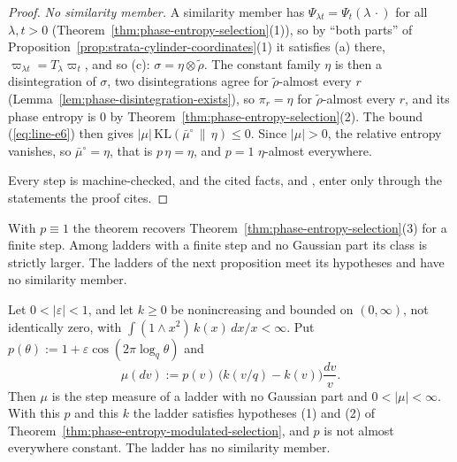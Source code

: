 \begin{proof}
\emph{No similarity member.} A similarity member has $\Psi_{\lambda t} = \Psi_t(\lambda\,\cdot)$
for all $\lambda, t > 0$ (Theorem~\ref{thm:phase-entropy-selection}(1)), so by ``both parts'' of
Proposition~\ref{prop:strata-cylinder-coordinates}(1) it satisfies (a) there,
$\varpi_{\lambda t} = T_\lambda\varpi_t$, and so (c): $\sigma = \eta \otimes \tilde\rho$. The
constant family $\eta$ is then a disintegration of $\sigma$, two disintegrations agree for
$\tilde\rho$-almost every $r$ (Lemma~\ref{lem:phase-disintegration-exists}), so $\pi_r = \eta$ for
$\tilde\rho$-almost every $r$, and its phase entropy is $0$ by
Theorem~\ref{thm:phase-entropy-selection}(2). The bound (\ref{eq:line-e6}) then gives
$|\mu|\,\mathrm{KL}(\bar\mu^\circ \,\|\, \eta) \le 0$. Since $|\mu| > 0$, the relative entropy
vanishes, so $\bar\mu^\circ = \eta$, that is $p\,\eta = \eta$, and $p = 1$ $\eta$-almost
everywhere.

Every step is machine-checked, and the cited facts,  and , enter only
through the statements the proof cites.
\end{proof}

With $p \equiv 1$ the theorem recovers Theorem~\ref{thm:phase-entropy-selection}(3) for a finite
step. Among ladders with a finite step and no Gaussian part its class is strictly larger. The
ladders of the next proposition meet its hypotheses and have no similarity member.

\begin{proposition}
\label{prop:modulated-selection-strict}

Let $0 < |\varepsilon| < 1$, and let $k \ge 0$ be nonincreasing and bounded on $(0,\infty)$, not
identically zero, with $\int(1 \wedge x^2)\,k(x)\,dx/x < \infty$. Put
$p(\theta) := 1 + \varepsilon\cos(2\pi\log_q\theta)$ and
\[
  \mu(dv) := p(v)\,\bigl(k(v/q) - k(v)\bigr)\frac{dv}{v} .
\]
Then $\mu$ is the step measure of a ladder with no Gaussian part and $0 < |\mu| < \infty$. With
this $p$ and this $k$ the ladder satisfies hypotheses (1) and (2) of
Theorem~\ref{thm:phase-entropy-modulated-selection}, and $p$ is not almost everywhere constant. The
ladder has no similarity member.
\end{proposition}

